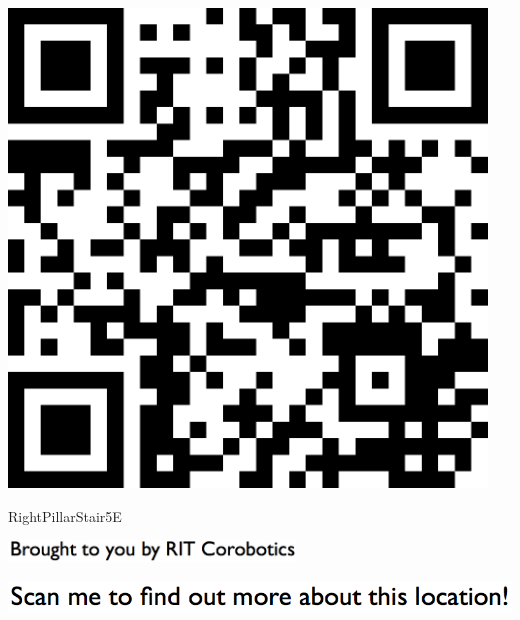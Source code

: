 \documentclass[letterpaper]{article}
\begin{document}
 \begingroup 
 \centerline{\includegraphics[scale=1,width=5in,height=5in]{RightPillarStair5E.png}} 
 \endgroup 
 \vspace*{\fill} 

 \hfill{\small RightPillarStair5E} 

  \vspace{0.7in} 
 
 \centerline{\includegraphics[scale=1,width=3in]{text-bottom.png}} 
 
 \pagebreak 
{} 
 \vspace*{\fill} 
 
  \centerline{\includegraphics[scale=1,width=6in]{text-top.png}} 
 
 \vspace{0.5in} 
 
\end{document}
